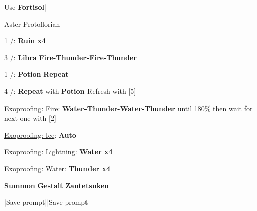 \begin{mainlist}
	\item Use \textbf{Fortisol}|\skip
\end{mainlist}
\begin{fight}{Aster Protoflorian}
	\item [1] \com/\rav: \textbf{Ruin x4}
	\item [3] \rav/\syn: \textbf{Libra} \to \textbf{Fire-Thunder-Fire-Thunder}
	\item [1] \com/\rav: \textbf{\textbf{Potion}} \to \textbf{Repeat}
	\item [4] \rav/\rav: \textbf{Repeat} with \textbf{Potion} \to Refresh with [5]
	\item \underline{Exoproofing: Fire}: \textbf{Water-Thunder-Water-Thunder} until 180\% then wait for next one with [2]
	\item \underline{Exoproofing: Ice}: \textbf{Auto}
	\item \underline{Exoproofing: Lightning}: \textbf{Water x4}
	\item \underline{Exoproofing: Water}: \textbf{Thunder x4}
	\item \textbf{Summon} \to \textbf{Gestalt} \to \textbf{Zantetsuken} |\skip
\end{fight}
\begin{mainlist}
	\item \skip|Save prompt||Save prompt
\end{mainlist}
